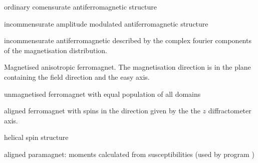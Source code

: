 \begin{list} {} {\setlength{\labelwidth}{2 cm}
  \setlength{\parsep}{-1ex}
  \setlength{\leftmargin}{\labelwidth}
 \addtolength{\leftmargin}{15mm}}
\item[\bd{ANTI} \hfill] ordinary comensurate antiferromagnetic structure
\item[\bd{AMOD} \hfill] incommensurate amplitude modulated antiferromagnetic structure
\item[\bd{INCM} \hfill] incommensurate antiferromagnetic described by the complex fourier components
of the magnetisation distribution.
\item[\bd{FANI} \hfill] Magnetised anisotropic ferromagnet. The magnetisation direction
is in the plane containing the field direction and the easy axis.
\item[\bd{FERO} \hfill] unmagnetised ferromagnet with equal population of all domains 
\item[\bd{FERA} \hfill] aligned ferromagnet with spins in the direction given by the
the $z$ diffractometer axis.
\item[\bd{HELI} \hfill] helical spin structure
\item[\bd{PARA} \hfill] aligned paramagnet: moments calculated from
susceptibilities (used by program ) \end{list}
 
